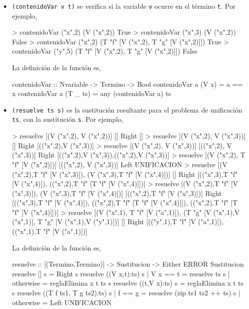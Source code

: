 \begin{itemize}
\item {} \texttt{(contenidoVar v t)} se
  verifica si la variable \texttt{v} ocurre en el término
  \texttt{t}. Por ejemplo,
\begin{sesion}
> contenidoVar ("x",2) (V ("x",2)) 
True
> contenidoVar ("x",3) (V ("x",2)) 
False
> contenidoVar ("x",2) 
  (T "f" [V ("x",2), T "g" [V ("x",2)]])
True
> contenidoVar ("y",5) 
  (T "f" [V ("x",2), T "g" [V ("x",2)]])
False
\end{sesion}
        
La definición de la función es,
       
\begin{codigo}
contenidoVar :: Nvariable -> Termino -> Bool
contenidoVar a (V x)    = a == x
contenidoVar a (T _ ts) = any (contenidoVar a) ts
\end{codigo}   

\item {} \texttt{(resuelve ts s)} es la
  sustitución resultante para el problema de unificación \texttt{ts},
  con la sustitución \texttt{s}. Por ejemplo,
\begin{sesion}
> resuelve [(V ("x",2), V ("x",2))] []
Right []
> resuelve [(V ("x",2), V ("x",3))] []
Right [(("x",2),V ("x",3))]
> resuelve [(V ("x",2), V ("x",3))] [(("x",2), V ("x",3))]
Right [(("x",2),V ("x",3)),(("x",2),V ("x",3))]
> resuelve [(V ("x",2), T "f" [V ("x",2)])] 
  [(("x",2), V ("x",3))]
Left UNIFICACION
> resuelve [(V ("x",2),T "f" [V ("x",3)]),
  (V ("x",3),T "f" [V ("x",4)])] []
Right [(("x",3),T "f" [V ("x",4)]),
(("x",2),T "f" [T "f" [V ("x",4)]])]
> resuelve [(V ("x",2),T "f" [V ("x",3)]),
  (V ("x",3),T "f" [V ("x",4)])] 
  [(("x",2),T "f" [V ("x",3)])]
Right [(("x",3),T "f" [V ("x",4)]),
(("x",2),T "f" [T "f" [V ("x",4)]]),
(("x",2),T "f" [T "f" [V ("x",4)]])]
> resuelve [(V ("x",1), T "f" [V ("a",1)]),
  (T "g" [V ("x",1),V ("x",1)], 
  T "g" [V ("x",1),V ("y",1)])] []
Right [(("y",1),T "f" [V ("a",1)]),
(("x",1),T "f" [V ("a",1)])]
\end{sesion}
        
La definición de la función es,
       
\begin{codigo}
resuelve :: [(Termino,Termino)] -> Sustitucion 
            -> Either ERROR Sustitucion
resuelve [] s = Right s
resuelve ((V x,t):ts) s 
    | V x == t  = resuelve ts s
    | otherwise = reglaElimina x t ts s
resuelve ((t,V x):ts) s = 
    reglaElimina x t ts s
resuelve ((T f ts1, T g ts2):ts) s 
    | f == g    = resuelve (zip ts1 ts2 ++ ts) s
    | otherwise = Left UNIFICACION
\end{codigo}   


\end{itemize}
